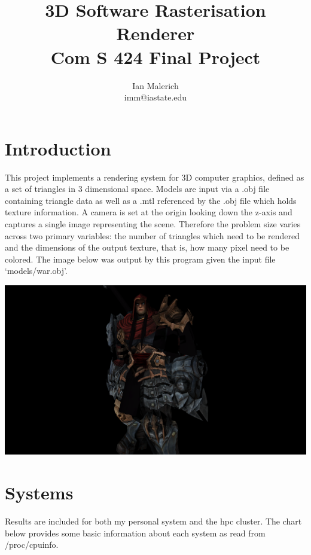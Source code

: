 \documentclass[12pt]{article}
\title{\vspace{-6ex}3D Software Rasterisation Renderer \\ \large Com S 424 Final Project}
\author{Ian Malerich \\ imm@iastate.edu}
\begin{document}
\raggedright

\maketitle

\section*{Introduction}

This project implements a rendering system for 3D computer graphics, defined as a set
of triangles in 3 dimensional space. Models are input via a .obj file containing triangle data
as well as a .mtl referenced by the .obj file which holds texture information. A camera is set
at the origin looking down the z-axis and captures a single image representing the scene.
Therefore the problem size varies across two primary variables: the number of triangles which
need to be rendered and the dimensions of the output texture, that is, how many pixel need
to be colored.  The image below was output by this program given the input file `models/war.obj'.

\smallbreak
\begin{center}
	\includegraphics[scale=0.17]{war.png}
\end{center}

\clearpage
\section*{Systems}

Results are included for both my personal system and the hpc cluster. 
The chart below provides some basic information about each system as read from /proc/cpuinfo.
\end{document}

